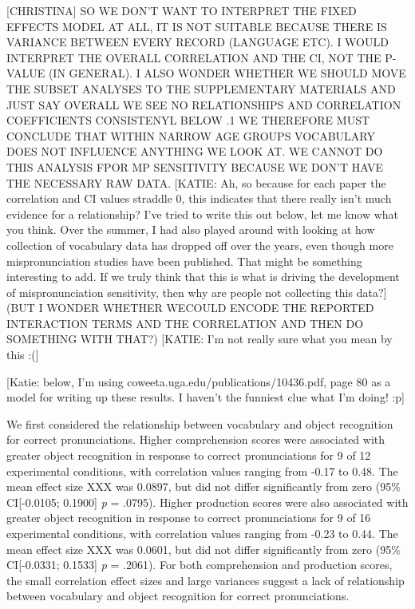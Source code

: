 \documentclass[man]{apa6}
\theoremstyle{definition}
\theoremstyle{definition}
\theoremstyle{definition}
\theoremstyle{remark}
\begin{document}
{[}CHRISTINA{]} SO WE DON'T WANT TO INTERPRET THE FIXED EFFECTS MODEL AT
ALL, IT IS NOT SUITABLE BECAUSE THERE IS VARIANCE BETWEEN EVERY RECORD
(LANGUAGE ETC). I WOULD INTERPRET THE OVERALL CORRELATION AND THE CI,
NOT THE P-VALUE (IN GENERAL). I ALSO WONDER WHETHER WE SHOULD MOVE THE
SUBSET ANALYSES TO THE SUPPLEMENTARY MATERIALS AND JUST SAY OVERALL WE
SEE NO RELATIONSHIPS AND CORRELATION COEFFICIENTS CONSISTENYL BELOW .1
WE THEREFORE MUST CONCLUDE THAT WITHIN NARROW AGE GROUPS VOCABULARY DOES
NOT INFLUENCE ANYTHING WE LOOK AT. WE CANNOT DO THIS ANALYSIS FPOR MP
SENSITIVITY BECAUSE WE DON'T HAVE THE NECESSARY RAW DATA. {[}KATIE: Ah,
so because for each paper the correlation and CI values straddle 0, this
indicates that there really isn't much evidence for a relationship? I've
tried to write this out below, let me know what you think. Over the
summer, I had also played around with looking at how collection of
vocabulary data has dropped off over the years, even though more
mispronunciation studies have been published. That might be something
interesting to add. If we truly think that this is what is driving the
development of mispronunciation sensitivity, then why are people not
collecting this data?{]} (BUT I WONDER WHETHER WECOULD ENCODE THE
REPORTED INTERACTION TERMS AND THE CORRELATION AND THEN DO SOMETHING
WITH THAT?) {[}KATIE: I'm not really sure what you mean by this :({]}

{[}Katie: below, I'm using coweeta.uga.edu/publications/10436.pdf, page
80 as a model for writing up these results. I haven't the funniest clue
what I'm doing! :p{]}

We first considered the relationship between vocabulary and object
recognition for correct pronunciations. Higher comprehension scores were
associated with greater object recognition in response to correct
pronunciations for 9 of 12 experimental conditions, with correlation
values ranging from -0.17 to 0.48. The mean effect size XXX was 0.0897,
but did not differ significantly from zero (95\% CI{[}-0.0105; 0.1900{]}
\emph{p} = .0795). Higher production scores were also associated with
greater object recognition in response to correct pronunciations for 9
of 16 experimental conditions, with correlation values ranging from
-0.23 to 0.44. The mean effect size XXX was 0.0601, but did not differ
significantly from zero (95\% CI{[}-0.0331; 0.1533{]} \emph{p} = .2061).
For both comprehension and production scores, the small correlation
effect sizes and large variances suggest a lack of relationship between
vocabulary and object recognition for correct pronunciations.
\end{document}
